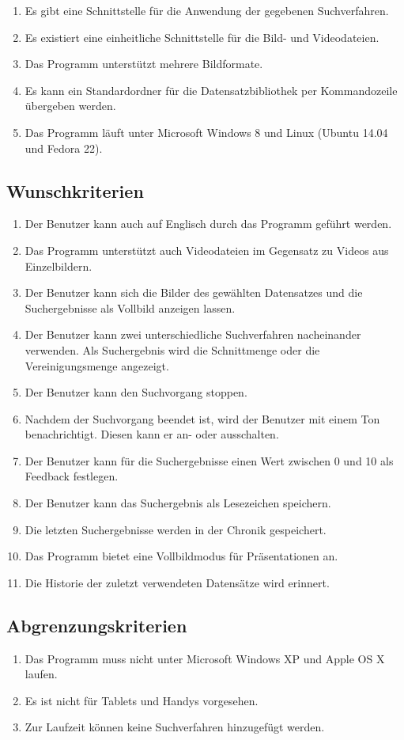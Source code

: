 \begin{enumerate} [label=\bfseries /MK \arabic*0/, leftmargin=*]
\item Es gibt eine Schnittstelle für die Anwendung der gegebenen Suchverfahren.
\item Es existiert eine einheitliche Schnittstelle für die Bild- und Videodateien.
\item Das Programm unterstützt mehrere Bildformate.
\item Es kann ein Standardordner für die Datensatzbibliothek per Kommandozeile übergeben werden.
\item Das Programm läuft unter Microsoft Windows 8 und Linux (Ubuntu 14.04 und Fedora 22).
\end{enumerate}
\subsection{Wunschkriterien}
\begin{enumerate} [label=\bfseries /WK \arabic*0/, leftmargin=*]
\item Der Benutzer kann auch auf Englisch durch das Programm geführt werden.
\item Das Programm unterstützt auch Videodateien im Gegensatz zu Videos aus Einzelbildern.
\item Der Benutzer kann sich die Bilder des gewählten Datensatzes und die Suchergebnisse als Vollbild anzeigen lassen.
\item Der Benutzer kann zwei unterschiedliche Suchverfahren nacheinander verwenden. Als Suchergebnis wird die Schnittmenge oder die Vereinigungsmenge angezeigt.
\item Der Benutzer kann den Suchvorgang stoppen.
\item Nachdem der Suchvorgang beendet ist, wird der Benutzer mit einem Ton benachrichtigt. Diesen kann er an- oder ausschalten.
\item Der Benutzer kann für die Suchergebnisse einen Wert zwischen 0 und 10 als \gls{Feedback} festlegen.
\item Der Benutzer kann das Suchergebnis als \gls{Lesezeichen} speichern.
\item Die letzten Suchergebnisse werden in der \gls{Chronik} gespeichert.
\item Das Programm bietet eine Vollbildmodus für Präsentationen an.
\item Die Historie der zuletzt verwendeten Datensätze wird erinnert.
\end{enumerate}
\subsection{Abgrenzungskriterien}
\begin{enumerate} [label=\bfseries /AK \arabic*0/, leftmargin=*]
\item Das Programm muss nicht unter Microsoft Windows XP und Apple OS X laufen. 
\item Es ist nicht für Tablets und Handys vorgesehen.
\item Zur Laufzeit können keine Suchverfahren hinzugefügt werden.
\end{enumerate}
\pagebreak
